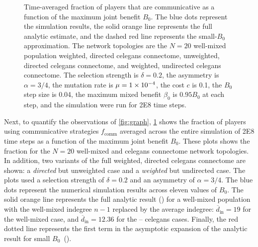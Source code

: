 \documentclass[pdflatex,lineno,referee,sn-mathphys-ay]{sn-jnl}
\begin{document}
\begin{figure}
  \centering
  
  \caption{
    Time-averaged fraction of players that are communicative as a function
    of the maximum joint benefit $B_0$.
    The blue dots represent the simulation results,
    the solid orange line represents the full analytic estimate,
    and the dashed red line represents the small-$B_0$ approximation.
    The network topologies are the
    $N=20$ well-mixed population
    weighted, directed \gls{celegans} connectome,
    unweighted, directed \gls{celegans} connectome,
    and
    weighted, undirected \gls{celegans} connectome.
    The selection strength is $\delta=0.2$,
    the asymmetry is $\alpha=3/4$,
    the mutation rate is $\mu=\num{1E-4}$,
    the cost $c$ is \num{0.1},
    the $B_0$ step size is \num{0.04},
    the maximum mixed benefit $\beta_0$ is $\num{0.95} B_0$ at each step,
    and the simulation were run for \num{2E8} time steps.
  }
  \label{fig:comm-frac}
\end{figure}

Next, to quantify the observations of \cref{fig:graph},
\cref{fig:comm-frac} shows the fraction of players
using communicative strategies $f_{\text{comm}}$ averaged across
the entire simulation of \num{2E8} time steps as a function
of the maximum joint benefit $B_0$.
These plots shows the fraction for the
$N=20$ well-mixed and
\gls{celegans} connectome network topologies.
In addition, two variants of the full weighted, directed \gls{celegans}
connectome are shown:
a  \emph{directed} but unweighted case
and
a  \emph{weighted} but undirected case.
The plots used a selection strength of $\delta=0.2$
and an asymmetry of $\alpha=3/4$.
The blue dots represent the numerical simulation results across eleven
values of $B_0$.
The solid orange line represents the full analytic
result () for a well-mixed population
with the well-mixed indegree $n-1$ replaced by the average
indegree: $\overline{d}_{\text{in}} = \num{19}$
for the  well-mixed case,
and $\overline{d}_{\text{in}} = \num{12.36}$ for the
--
\gls{celegans} cases.
Finally, the red dotted line represents the first term
in the asymptotic expansion
of the analytic result for small $B_0$~().
\end{document}
